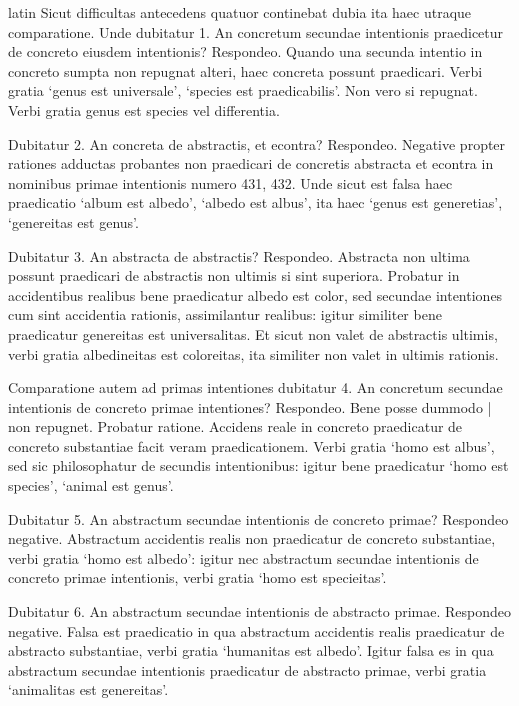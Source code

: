 \begin{otherlanguage*}{latin}
\pstart
Sicut difficultas antecedens quatuor continebat dubia ita haec utraque comparatione. Unde dubitatur 1. An concretum secundae intentionis praedicetur de concreto eiusdem intentionis? Respondeo. Quando una secunda intentio in concreto sumpta non repugnat alteri, haec concreta possunt praedicari. Verbi gratia `genus est universale', `species est praedicabilis'. Non vero si repugnat. Verbi gratia genus est species vel differentia. 
\pend

\pstart
Dubitatur 2. An concreta de abstractis, et econtra? Respondeo. Negative propter rationes adductas probantes non praedicari de concretis abstracta et econtra in nominibus primae intentionis numero 431, 432. Unde sicut est falsa haec praedicatio `album est albedo', `albedo est albus', ita haec `genus est generetias', `genereitas est genus'. 
\pend

\pstart
Dubitatur 3. An abstracta de abstractis? Respondeo. Abstracta non ultima possunt praedicari de abstractis non ultimis si sint superiora. Probatur in accidentibus realibus bene praedicatur albedo est color, sed secundae intentiones cum sint accidentia rationis, assimilantur realibus:
igitur similiter bene praedicatur genereitas est universalitas. Et sicut non valet de abstractis ultimis, verbi gratia albedineitas est coloreitas, ita similiter non valet in ultimis rationis. 
\pend

\pstart
Comparatione autem ad primas intentiones dubitatur 4. An concretum secundae intentionis de concreto primae intentiones? Respondeo. Bene posse dummodo \textnormal{|} non repugnet. Probatur ratione. Accidens reale in concreto praedicatur de concreto substantiae facit veram praedicationem. Verbi gratia `homo est albus', sed sic philosophatur de secundis intentionibus:
igitur bene praedicatur `homo est species', `animal est genus'. 
\pend

\pstart
Dubitatur 5. An abstractum secundae intentionis de concreto primae? Respondeo negative. Abstractum accidentis realis non praedicatur de concreto substantiae, verbi gratia `homo est albedo':
igitur nec abstractum secundae intentionis de concreto primae intentionis, verbi gratia `homo est specieitas'. 
\pend

\pstart
Dubitatur 6. An abstractum secundae intentionis de abstracto primae. Respondeo negative. Falsa est praedicatio in qua abstractum accidentis realis praedicatur de abstracto substantiae, verbi gratia `humanitas est albedo'. Igitur falsa es in qua abstractum secundae intentionis praedicatur de abstracto primae, verbi gratia `animalitas est genereitas'. 
\pend


\end{otherlanguage*}
